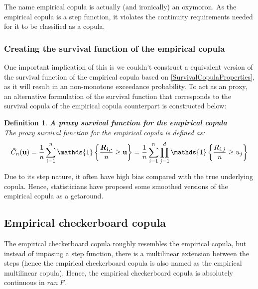\documentclass[12pt]{report}
\newtheorem{definition}{Definition}[subsection]
\newcommand{\1}{\mathbf{1}}
\begin{document}
\begin{flushleft}
The name empirical copula is actually (and ironically) an oxymoron. As the empirical copula is a step function, it violates the continuity requirements needed for it to be classified as a copula.\\

\newpage
\subsubsection{Creating the survival function of the empirical copula}
\vspace{0,5cm}
One important implication of this is we couldn't construct a equivalent version of the survival function of the empirical copula based on \ref{SurvivalCopulaProperties}, as it will result in an non-monotone exceedance probability. To act as an proxy, an alternative formulation of the survival function that corresponds to the survival copula of the empirical copula counterpart is constructed below:

\begin{definition}\label{SurvECDef}
\textbf{A proxy survival function for the empirical copula} \\
The proxy survival function for the empirical copula is defined as:
\begin{align*}
\Bar{C}_{n}(\textbf{u}) = \frac{1}{n} \sum\limits_{i = 1}^{n} \mathds{1}\left\{ \frac{\boldsymbol{R_{i,\cdot}}}{n} \ge \textbf{u} \right\} = \frac{1}{n} \sum\limits_{i = 1}^{n} \prod\limits_{j = 1}^{d} \mathds{1}\left\{ \frac{R_{i,j}}{n} \ge u_{j} \right\}
\end{align*}
\end{definition}
Due to its step nature, it often have high bias compared with the true underlying copula. Hence, statisticians have proposed some smoothed versions of the empirical copula as a getaround.

\vspace{0.5cm}
\subsection{Empirical checkerboard copula}
\vspace{0.5cm}

The empirical checkerboard copula roughly resembles the empirical copula, but instead of imposing a step function, there is a multilinear extension between the steps (hence the empirical checkerboard copula is also named as the empirical multilinear copula). Hence, the empirical checkerboard copula is absolutely continuous in $ran \: F$.


\end{flushleft}
\end{document}

